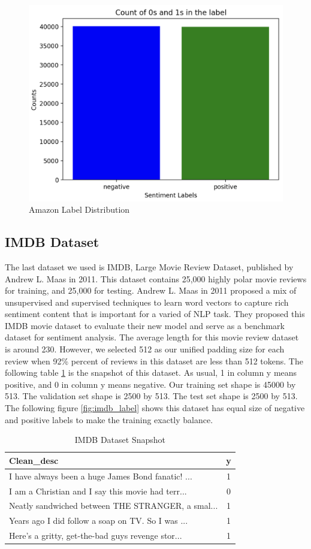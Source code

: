 \documentclass{article}
\begin{document}
\begin{figure}[H]
    \centering
    \includegraphics[width=0.5\linewidth]{amazon_labels.png}
    \caption{Amazon Label Distribution}
    \label{fig:amazon_label}
\end{figure}

\subsection{IMDB Dataset}
The last dataset we used is IMDB, Large Movie Review Dataset, published by Andrew L. Maas \cite{maas-etal-2011-learning} in 2011. This dataset contains 25,000 highly polar movie reviews for training, and 25,000 for testing. Andrew L. Maas \cite{maas-etal-2011-learning} in 2011 proposed a mix of unsupervised and supervised techniques to learn word vectors to capture rich sentiment content that is important for a varied of NLP task. They proposed this IMDB movie dataset to evaluate their new model and serve as a benchmark dataset for sentiment analysis. The average length for this movie review dataset is around 230. However, we selected 512 as our unified padding size for each review when 92\% percent of reviews in this dataset are less than 512 tokens. The following table \ref{tab:IMDB} is the snapshot of this dataset. As usual, 1 in column y means positive, and 0 in column y means negative. Our training set shape is 45000 by 513. The validation set shape is 2500 by 513. The test set shape is 2500 by 513. The following figure \ref{fig:imdb_label} shows this dataset has equal size of negative and positive labels to make the training exactly balance. 
\begin{table}[H]
    \centering
    \begin{tabular}{|l|c|}
\hline Clean\_desc & y \\
\hline I have always been a huge James Bond fanatic! ... & 1 \\
\hline I am a Christian and I say this movie had terr... & 0 \\
\hline Neatly sandwiched between THE STRANGER, a smal... & 1 \\
\hline Years ago I did follow a soap on TV. So I was ... & 1 \\
\hline Here's a gritty, get-the-bad guys revenge stor... & 1 \\
\hline
\end{tabular}
    \caption{IMDB Dataset Snapshot}
    \label{tab:IMDB}
\end{table}
\end{document}
